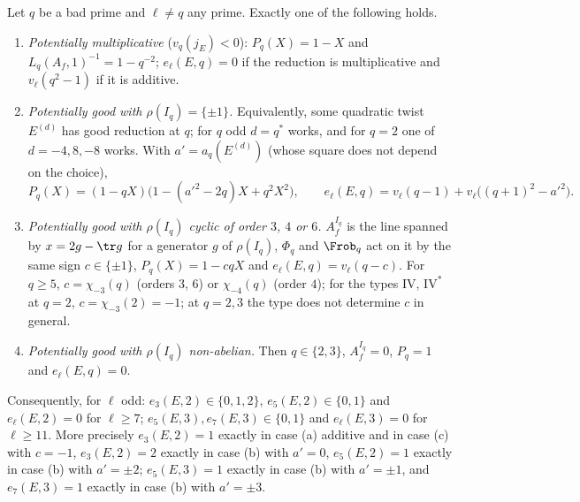 \begin{proposition}\label{prop:lfunctions:all-shapes}
Let $q$ be a bad prime and $\ell\ne q$ any prime. Exactly one of the following holds.
\begin{enumerate}[label=(\alph*)]
\item \emph{Potentially multiplicative} ($v_q(j_E)<0$): $P_q(X)=1-X$ and $L_q(A_f,1)^{-1}=1-q^{-2}$; $e_\ell(E,q)=0$ if the reduction is multiplicative and $v_\ell(q^2-1)$ if it is additive.
\item \emph{Potentially good with $\rho(I_q)=\{\pm1\}$.} Equivalently, some quadratic twist $E^{(d)}$ has good reduction at $q$; for $q$ odd $d=q^*$ works, and for $q=2$ one of
$d=-4,8,-8$ works. With $a'=a_q(E^{(d)})$ (whose square does not depend on the choice),
\[
P_q(X)=(1-qX)\bigl(1-(a'^2-2q)X+q^2X^2\bigr),\qquad e_\ell(E,q)=v_\ell(q-1)+v_\ell\bigl((q+1)^2-a'^2\bigr).
\]
\item \emph{Potentially good with $\rho(I_q)$ cyclic of order $3$, $4$ or $6$.} $A_f^{I_q}$ is the line spanned by $x=2g-\tr g$ for a generator $g$ of $\rho(I_q)$, $\Phi_q$ and $\Frob_q$ act on
it by the same sign $c\in\{\pm1\}$, $P_q(X)=1-cqX$ and $e_\ell(E,q)=v_\ell(q-c)$. For $q\ge5$, $c=\chi_{-3}(q)$ (orders $3$, $6$) or $\chi_{-4}(q)$ (order $4$); for the types
$\mathrm{IV}$, $\mathrm{IV}^*$ at $q=2$, $c=\chi_{-3}(2)=-1$; at $q=2,3$ the type does not determine $c$ in general.
\item \emph{Potentially good with $\rho(I_q)$ non-abelian.} Then $q\in\{2,3\}$, $A_f^{I_q}=0$, $P_q=1$ and $e_\ell(E,q)=0$.
\end{enumerate}
Consequently, for $\ell$ odd: $e_3(E,2)\in\{0,1,2\}$, $e_5(E,2)\in\{0,1\}$ and $e_\ell(E,2)=0$ for $\ell\ge7$; $e_5(E,3),e_7(E,3)\in\{0,1\}$ and $e_\ell(E,3)=0$ for $\ell\ge11$.
More precisely $e_3(E,2)=1$ exactly in case (a) additive and in case (c) with $c=-1$, $e_3(E,2)=2$ exactly in case (b) with $a'=0$, $e_5(E,2)=1$ exactly in case (b) with
$a'=\pm2$; $e_5(E,3)=1$ exactly in case (b) with $a'=\pm1$, and $e_7(E,3)=1$ exactly in case (b) with $a'=\pm3$.
\end{proposition}

